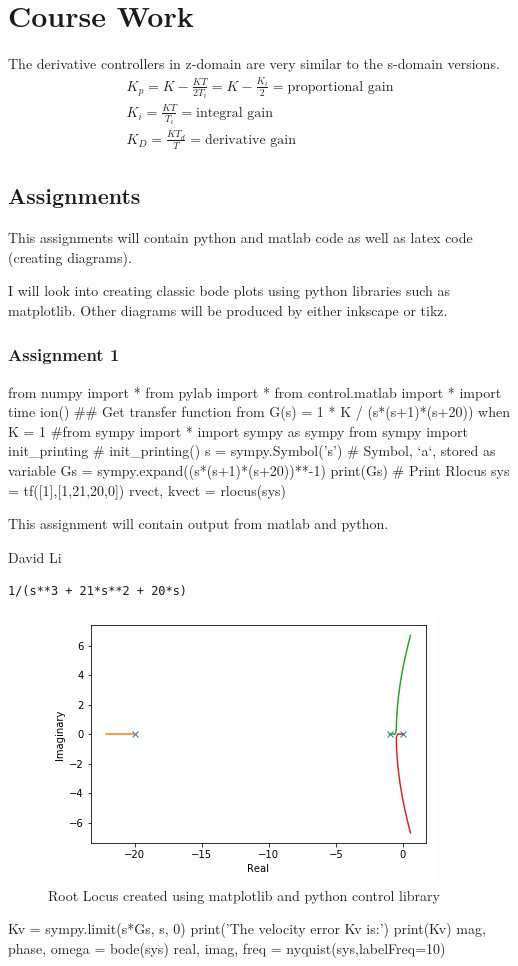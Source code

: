 \documentclass{scrreprt}
\theoremstyle{plain}
\theoremstyle{definition}
\theoremstyle{remark}
\begin{document}
\part{Course Work}
The derivative controllers in z-domain are very similar to the s-domain versions.
\begin{align}
K_p = K- \frac{KT}{2T_i}=K-\frac{K_i}{2}=\text{proportional gain} \\
K_i = \frac{KT}{T_i}=\text{integral gain} \\
K_D = \frac{KT_d}{T}=\text{derivative gain}
\end{align}

\chapter{Assignments}
This assignments will contain python and matlab code as well as latex code (creating diagrams).

I will look into creating classic bode plots using python libraries such as matplotlib. Other diagrams will be produced by either inkscape or tikz.
\section{Assignment 1}

\begin{pythonscript}
from numpy import *
from pylab import * 
from control.matlab import *   
import time
ion()
## Get transfer function from G(s) = 1 * K / (s*(s+1)*(s+20)) when K = 1
#from sympy import *
import sympy as sympy
from sympy import init_printing
# %
init_printing()
s = sympy.Symbol('s')  # Symbol, `a`, stored as variable
Gs = sympy.expand((s*(s+1)*(s+20))**-1)
print(Gs)
# Print Rlocus
sys = tf([1],[1,21,20,0])
rvect, kvect = rlocus(sys)
\end{pythonscript}
\epigraph{This assignment will contain output from matlab and python.}{David Li}
\begin{verbatim}
1/(s**3 + 21*s**2 + 20*s)
\end{verbatim}
\begin{figure}
	\includegraphics[width=0.7\linewidth]{Assignments/A1/ipython_files/qt_img486735758753796}
	\caption{Root Locus created using matplotlib and python control library}
	\label{fig:qtimg486735758753796}
\end{figure}
\begin{pythonscript}
	Kv = sympy.limit(s*Gs, s, 0)
	print('The velocity error Kv is:')
	print(Kv)
	mag, phase, omega = bode(sys)
	real, imag, freq = nyquist(sys,labelFreq=10)
\end{pythonscript}
\end{document}
